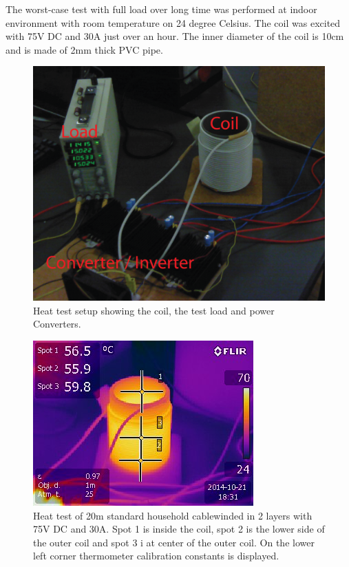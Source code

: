 \noindent
The worst-case test with full load over long time was performed at indoor environment with room temperature on 24 degree Celsius. The coil was excited with 75V DC and 30A just over an hour. The inner diameter of the coil is 10cm and is made of 2mm thick PVC pipe.

\begin{figure}[H]
   \centering
   \includegraphics[scale=0.5]{graphics/heat_test/heat_test_setup.png}
   \caption{Heat test setup showing the coil, the test load and power Converters.}
   \end{figure}
      

\begin{figure}[H]
\centering
\includegraphics[scale=1]{graphics/heat_test/IR_1491.jpg}
\caption[Heat test, image from thermal camera]{Heat test of 20m standard household cable\footnotemark winded in 2 layers with 75V DC and 30A. Spot 1 is inside the coil, spot 2 is the lower side of the outer coil and spot 3 i at center of the outer coil. On the lower left corner thermometer calibration constants is displayed.}
\label{fig:heat_test_ir}
\end{figure}

